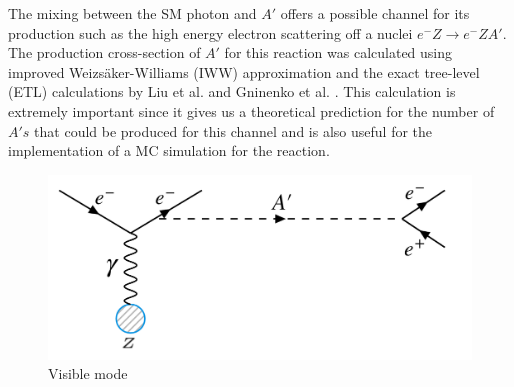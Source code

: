The mixing between the SM photon and $A'$ offers a possible channel for its production such as the high energy electron scattering off a nuclei $e^-Z\rightarrow e^- Z A'$. The production cross-section of $A'$ for this reaction was calculated using improved Weizsäker-Williams (IWW) approximation and the exact tree-level (ETL) calculations by Liu et al. \cite{Liu:2017htz} and Gninenko et al. \cite{Gninenko:2017yus}. This calculation is extremely important since it gives us a theoretical prediction for the number of $A's$ that could be produced for this channel and is also useful for the implementation of a MC simulation for the reaction.

\begin{figure}[t!]
\centering
\includegraphics[width=14.5cm]{thesis_figures/VISIBLE.png}
\caption{Visible mode }
\label{fig:Visible_feynman}
\end{figure}

